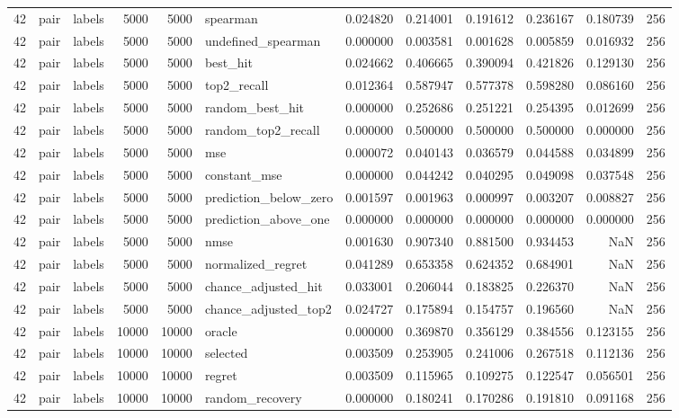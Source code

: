 \begin{tabular}{rllrrlrrrrrr}
42 & pair & labels & 5000 & 5000 & spearman & 0.024820 & 0.214001 & 0.191612 & 0.236167 & 0.180739 & 256 \\
42 & pair & labels & 5000 & 5000 & undefined_spearman & 0.000000 & 0.003581 & 0.001628 & 0.005859 & 0.016932 & 256 \\
42 & pair & labels & 5000 & 5000 & best_hit & 0.024662 & 0.406665 & 0.390094 & 0.421826 & 0.129130 & 256 \\
42 & pair & labels & 5000 & 5000 & top2_recall & 0.012364 & 0.587947 & 0.577378 & 0.598280 & 0.086160 & 256 \\
42 & pair & labels & 5000 & 5000 & random_best_hit & 0.000000 & 0.252686 & 0.251221 & 0.254395 & 0.012699 & 256 \\
42 & pair & labels & 5000 & 5000 & random_top2_recall & 0.000000 & 0.500000 & 0.500000 & 0.500000 & 0.000000 & 256 \\
42 & pair & labels & 5000 & 5000 & mse & 0.000072 & 0.040143 & 0.036579 & 0.044588 & 0.034899 & 256 \\
42 & pair & labels & 5000 & 5000 & constant_mse & 0.000000 & 0.044242 & 0.040295 & 0.049098 & 0.037548 & 256 \\
42 & pair & labels & 5000 & 5000 & prediction_below_zero & 0.001597 & 0.001963 & 0.000997 & 0.003207 & 0.008827 & 256 \\
42 & pair & labels & 5000 & 5000 & prediction_above_one & 0.000000 & 0.000000 & 0.000000 & 0.000000 & 0.000000 & 256 \\
42 & pair & labels & 5000 & 5000 & nmse & 0.001630 & 0.907340 & 0.881500 & 0.934453 & NaN & 256 \\
42 & pair & labels & 5000 & 5000 & normalized_regret & 0.041289 & 0.653358 & 0.624352 & 0.684901 & NaN & 256 \\
42 & pair & labels & 5000 & 5000 & chance_adjusted_hit & 0.033001 & 0.206044 & 0.183825 & 0.226370 & NaN & 256 \\
42 & pair & labels & 5000 & 5000 & chance_adjusted_top2 & 0.024727 & 0.175894 & 0.154757 & 0.196560 & NaN & 256 \\
42 & pair & labels & 10000 & 10000 & oracle & 0.000000 & 0.369870 & 0.356129 & 0.384556 & 0.123155 & 256 \\
42 & pair & labels & 10000 & 10000 & selected & 0.003509 & 0.253905 & 0.241006 & 0.267518 & 0.112136 & 256 \\
42 & pair & labels & 10000 & 10000 & regret & 0.003509 & 0.115965 & 0.109275 & 0.122547 & 0.056501 & 256 \\
42 & pair & labels & 10000 & 10000 & random_recovery & 0.000000 & 0.180241 & 0.170286 & 0.191810 & 0.091168 & 256 \\

\end{tabular}
